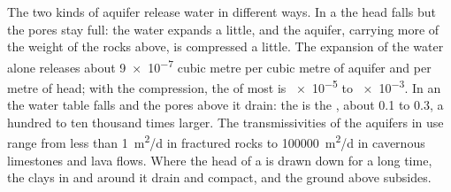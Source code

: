 The two kinds of aquifer release water in different ways. In a  the head falls but the pores stay full: the water expands a
little, and the aquifer, carrying more of the weight of the rocks above,
is compressed a little. The expansion of the water alone releases about
\num{9e-7} cubic metre per cubic metre of aquifer and per metre of head;
with the compression, the  of most  is
\num{e-5} to \num{e-3}. In an  the water table falls and
the pores above it drain: the  is the , about 0.1
to 0.3, a hundred to ten thousand times larger. The transmissivities of
the aquifers in use range from less than \qty{1}{m^2/d} in fractured rocks
to \qty{100000}{m^2/d} in cavernous limestones and lava flows. Where the
head of a  is drawn down for a long time, the clays in and
around it drain and compact, and the ground above subsides.

